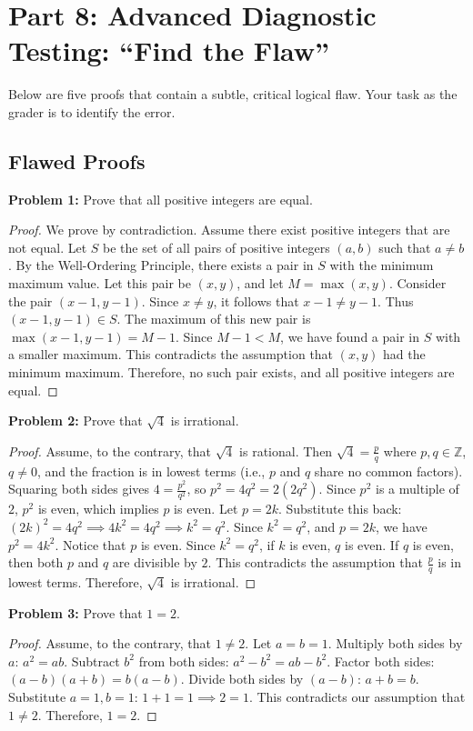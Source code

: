 \documentclass[11pt, letterpaper]{article}
\theoremstyle{remark}
\newcommand{\Z}{\mathbb{Z}}
\begin{document}
\section{Part 8: Advanced Diagnostic Testing: ``Find the Flaw''}

Below are five proofs that contain a subtle, critical logical flaw. Your task as the grader is to identify the error.

\subsection{Flawed Proofs}

\textbf{Problem 1:} Prove that all positive integers are equal.
\begin{proof}
We prove by contradiction. Assume there exist positive integers that are not equal. Let $S$ be the set of all pairs of positive integers $(a, b)$ such that $a \neq b$. By the Well-Ordering Principle, there exists a pair in $S$ with the minimum maximum value. Let this pair be $(x, y)$, and let $M = \max(x, y)$.
Consider the pair $(x-1, y-1)$. Since $x \neq y$, it follows that $x-1 \neq y-1$. Thus $(x-1, y-1) \in S$.
The maximum of this new pair is $\max(x-1, y-1) = M - 1$.
Since $M - 1 < M$, we have found a pair in $S$ with a smaller maximum. This contradicts the assumption that $(x, y)$ had the minimum maximum.
Therefore, no such pair exists, and all positive integers are equal.
\end{proof}

\textbf{Problem 2:} Prove that $\sqrt{4}$ is irrational.
\begin{proof}
Assume, to the contrary, that $\sqrt{4}$ is rational. Then $\sqrt{4} = \frac{p}{q}$ where $p, q \in \Z$, $q \neq 0$, and the fraction is in lowest terms (i.e., $p$ and $q$ share no common factors).
Squaring both sides gives $4 = \frac{p^2}{q^2}$, so $p^2 = 4q^2 = 2(2q^2)$.
Since $p^2$ is a multiple of $2$, $p^2$ is even, which implies $p$ is even. Let $p = 2k$.
Substitute this back: $(2k)^2 = 4q^2 \implies 4k^2 = 4q^2 \implies k^2 = q^2$.
Since $k^2 = q^2$, and $p = 2k$, we have $p^2 = 4k^2$.
Notice that $p$ is even. Since $k^2 = q^2$, if $k$ is even, $q$ is even. If $q$ is even, then both $p$ and $q$ are divisible by $2$. This contradicts the assumption that $\frac{p}{q}$ is in lowest terms.
Therefore, $\sqrt{4}$ is irrational.
\end{proof}

\textbf{Problem 3:} Prove that $1 = 2$.
\begin{proof}
Assume, to the contrary, that $1 \neq 2$.
Let $a = b = 1$.
Multiply both sides by $a$: $a^2 = ab$.
Subtract $b^2$ from both sides: $a^2 - b^2 = ab - b^2$.
Factor both sides: $(a-b)(a+b) = b(a-b)$.
Divide both sides by $(a-b)$: $a + b = b$.
Substitute $a = 1, b = 1$: $1 + 1 = 1 \implies 2 = 1$.
This contradicts our assumption that $1 \neq 2$. Therefore, $1 = 2$.
\end{proof}
\end{document}
